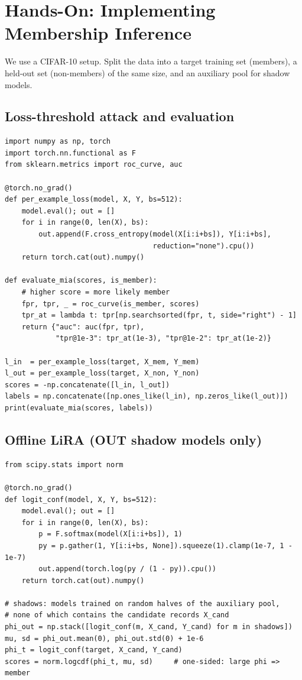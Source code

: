 \documentclass[10pt,a4paper]{extarticle}
\theoremstyle{definition}
\begin{document}
\section{Hands-On: Implementing Membership Inference}

We use a CIFAR-10 setup. Split the data into a target training set (members), a held-out set (non-members) of the same size, and an auxiliary pool for shadow models.

\subsection{Loss-threshold attack and evaluation}

\begin{lstlisting}
import numpy as np, torch
import torch.nn.functional as F
from sklearn.metrics import roc_curve, auc

@torch.no_grad()
def per_example_loss(model, X, Y, bs=512):
    model.eval(); out = []
    for i in range(0, len(X), bs):
        out.append(F.cross_entropy(model(X[i:i+bs]), Y[i:i+bs],
                                   reduction="none").cpu())
    return torch.cat(out).numpy()

def evaluate_mia(scores, is_member):
    # higher score = more likely member
    fpr, tpr, _ = roc_curve(is_member, scores)
    tpr_at = lambda t: tpr[np.searchsorted(fpr, t, side="right") - 1]
    return {"auc": auc(fpr, tpr),
            "tpr@1e-3": tpr_at(1e-3), "tpr@1e-2": tpr_at(1e-2)}

l_in  = per_example_loss(target, X_mem, Y_mem)
l_out = per_example_loss(target, X_non, Y_non)
scores = -np.concatenate([l_in, l_out])
labels = np.concatenate([np.ones_like(l_in), np.zeros_like(l_out)])
print(evaluate_mia(scores, labels))
\end{lstlisting}

\subsection{Offline LiRA (OUT shadow models only)}

\begin{lstlisting}
from scipy.stats import norm

@torch.no_grad()
def logit_conf(model, X, Y, bs=512):
    model.eval(); out = []
    for i in range(0, len(X), bs):
        p = F.softmax(model(X[i:i+bs]), 1)
        py = p.gather(1, Y[i:i+bs, None]).squeeze(1).clamp(1e-7, 1 - 1e-7)
        out.append(torch.log(py / (1 - py)).cpu())
    return torch.cat(out).numpy()

# shadows: models trained on random halves of the auxiliary pool,
# none of which contains the candidate records X_cand
phi_out = np.stack([logit_conf(m, X_cand, Y_cand) for m in shadows])
mu, sd = phi_out.mean(0), phi_out.std(0) + 1e-6
phi_t = logit_conf(target, X_cand, Y_cand)
scores = norm.logcdf(phi_t, mu, sd)     # one-sided: large phi => member
\end{lstlisting}
\end{document}
